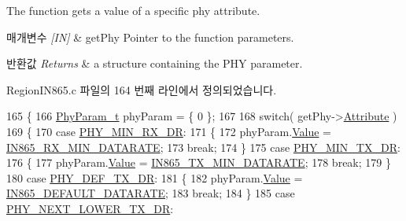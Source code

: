 The function gets a value of a specific phy attribute. 


\begin{DoxyParams}{매개변수}
{\em \mbox{[}\+I\+N\mbox{]}} & get\+Phy Pointer to the function parameters.\\
\hline
\end{DoxyParams}

\begin{DoxyRetVals}{반환값}
{\em Returns} & a structure containing the P\+HY parameter. \\
\hline
\end{DoxyRetVals}


Region\+I\+N865.\+c 파일의 164 번째 라인에서 정의되었습니다.


\begin{DoxyCode}
165 \{
166     \mbox{\hyperlink{unionu_phy_param}{PhyParam\_t}} phyParam = \{ 0 \};
167 
168     \textcolor{keywordflow}{switch}( getPhy->\mbox{\hyperlink{structs_get_phy_params_abdcb168ffd6913b85e2f635d7a475f2d}{Attribute}} )
169     \{
170         \textcolor{keywordflow}{case} \mbox{\hyperlink{group___r_e_g_i_o_n_gga51cbe8f5433d914fe9cf81b451de2c2da91cb5d84f937c32cd635dd7efe7a9d3a}{PHY\_MIN\_RX\_DR}}:
171         \{
172             phyParam.\mbox{\hyperlink{unionu_phy_param_a8e0dcce3428a8051614e852b8836d0d1}{Value}} = \mbox{\hyperlink{group___r_e_g_i_o_n_i_n865_ga59fe5dabb4cddd00deb343648d18e8cc}{IN865\_RX\_MIN\_DATARATE}};
173             \textcolor{keywordflow}{break};
174         \}
175         \textcolor{keywordflow}{case} \mbox{\hyperlink{group___r_e_g_i_o_n_gga51cbe8f5433d914fe9cf81b451de2c2daace3e56c88b40def8ed6a9106871e7de}{PHY\_MIN\_TX\_DR}}:
176         \{
177             phyParam.\mbox{\hyperlink{unionu_phy_param_a8e0dcce3428a8051614e852b8836d0d1}{Value}} = \mbox{\hyperlink{group___r_e_g_i_o_n_i_n865_ga334bf7f8b226ad91762f977490af0c72}{IN865\_TX\_MIN\_DATARATE}};
178             \textcolor{keywordflow}{break};
179         \}
180         \textcolor{keywordflow}{case} \mbox{\hyperlink{group___r_e_g_i_o_n_gga51cbe8f5433d914fe9cf81b451de2c2da70c3923333165960549162e3dcf10467}{PHY\_DEF\_TX\_DR}}:
181         \{
182             phyParam.\mbox{\hyperlink{unionu_phy_param_a8e0dcce3428a8051614e852b8836d0d1}{Value}} = \mbox{\hyperlink{group___r_e_g_i_o_n_i_n865_ga2bf71935d5975ceb0e8e9b1e810e52f9}{IN865\_DEFAULT\_DATARATE}};
183             \textcolor{keywordflow}{break};
184         \}
185         \textcolor{keywordflow}{case} \mbox{\hyperlink{group___r_e_g_i_o_n_gga51cbe8f5433d914fe9cf81b451de2c2dac002e7e492cf30dbf9c544b062f5cc8a}{PHY\_NEXT\_LOWER\_TX\_DR}}:

\end{DoxyCode}
